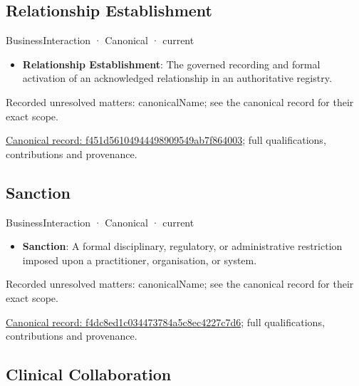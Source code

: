 \subsection{Relationship Establishment}

\label{element:f451d56104944498909549ab7f864003}
{\small BusinessInteraction · Canonical · current}\par

\begin{itemize}


\item \textbf{Relationship Establishment}: The governed recording and formal activation of an acknowledged relationship in an authoritative registry.

\end{itemize}

{\small Recorded unresolved matters: canonicalName; see the canonical record for their exact scope.}\par
{\footnotesize \href{../../../../continuum/business/business-interaction/f451d56104944498909549ab7f864003.md}{Canonical record: f451d56104944498909549ab7f864003}; full qualifications, contributions and provenance.}\par
\subsection{Sanction}

\label{element:f4dc8ed1c034473784a5c8ec4227c7d6}
{\small BusinessInteraction · Canonical · current}\par

\begin{itemize}


\item \textbf{Sanction}: A formal disciplinary, regulatory, or administrative restriction imposed upon a practitioner, organisation, or system.

\end{itemize}

{\small Recorded unresolved matters: canonicalName; see the canonical record for their exact scope.}\par
{\footnotesize \href{../../../../continuum/business/business-interaction/f4dc8ed1c034473784a5c8ec4227c7d6.md}{Canonical record: f4dc8ed1c034473784a5c8ec4227c7d6}; full qualifications, contributions and provenance.}\par
\subsection{Clinical Collaboration}

